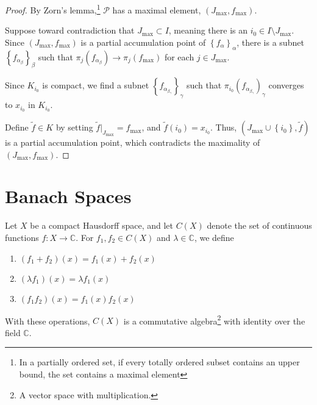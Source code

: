 \documentclass[12pt]{extarticle}
\newcommand{\C}{\mathbb{C}}
\newcommand{\set}[1]{\left\{#1\right\}}
\theoremstyle{plain}
\theoremstyle{definition}
\theoremstyle{note}
\renewcommand{\newline}{\hfill\break}
\begin{document}
\begin{proof}
  By Zorn's lemma,\footnote{In a partially ordered set, if every totally ordered subset contains an upper bound, the set contains a maximal element} $\mathcal{P}$ has a maximal element, $\left(J_{\text{max}},f_{\text{max}}\right)$.\newline

  Suppose toward contradiction that $J_{\text{max}}\subset I$, meaning there is an $i_0\in I\setminus J_{\text{max}}$. Since $\left(J_{\text{max}},f_{\text{max}}\right)$ is a partial accumulation point of $\set{f_{\alpha}}_{\alpha}$, there is a subnet $\set{f_{\alpha_\beta}}_{\beta}$ such that $\pi_{j}\left(f_{\alpha_\beta}\right) \rightarrow \pi_{j}\left(f_{\text{max}}\right)$ for each $j\in J_{\text{max}}$.\newline

  Since $K_{i_0}$ is compact, we find a subnet $\set{f_{\alpha_{\beta_{\gamma}}}}_{\gamma}$ such that $\pi_{i_0}\left(f_{\alpha_{\beta_{\gamma}}}\right)_{\gamma}$ converges to $x_{i_0}$ in $K_{i_0}$.\newline

  Define $\tilde{f} \in K$ by setting $\tilde{f}\vert_{J_{\text{max}}} = f_{\text{max}}$, and $\tilde{f}(i_0) = x_{i_0}$. Thus, $\left(J_{\text{max}}\cup \set{i_0},\tilde{f}\right)$ is a partial accumulation point, which contradicts the maximality of $\left(J_{\text{max}},f_{\text{max}}\right)$.
\end{proof}
\section{Banach Spaces}%
Let $X$ be a compact Hausdorff space, and let $C(X)$ denote the set of continuous functions $f: X\rightarrow \C$. For $f_1,f_2\in C(X)$ and $\lambda\in \C$, we define
\begin{enumerate}[(1)]
  \item $\displaystyle \left(f_1 + f_2\right)(x) = f_1(x) + f_2(x)$
  \item $\displaystyle \left(\lambda f_1\right)(x) = \lambda f_1(x)$
  \item $\displaystyle \left(f_1f_2\right)(x) = f_1(x)f_2(x)$
\end{enumerate}
With these operations, $C(X)$ is a commutative algebra\footnote{A vector space with multiplication.} with identity over the field $\C$.\newline
\end{document}
